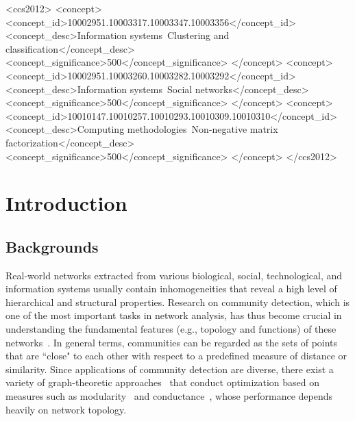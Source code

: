 \documentclass[format=acmsmall, review=false, screen=true]{acmart}
\begin{document}
%
%
\begin{CCSXML}
<ccs2012>
<concept>
<concept_id>10002951.10003317.10003347.10003356</concept_id>
<concept_desc>Information systems~Clustering and classification</concept_desc>
<concept_significance>500</concept_significance>
</concept>
<concept>
<concept_id>10002951.10003260.10003282.10003292</concept_id>
<concept_desc>Information systems~Social networks</concept_desc>
<concept_significance>500</concept_significance>
</concept>
<concept>
<concept_id>10010147.10010257.10010293.10010309.10010310</concept_id>
<concept_desc>Computing methodologies~Non-negative matrix factorization</concept_desc>
<concept_significance>500</concept_significance>
</concept>
</ccs2012>
\end{CCSXML}



\maketitle

\section{Introduction}\label{sec:1}
\subsection{Backgrounds}
Real-world networks extracted from various biological, social, technological, and information systems usually contain inhomogeneities that reveal a high level of hierarchical and structural properties. Research on community detection, which is one of the most important tasks in network analysis, has thus become crucial in understanding the fundamental features (e.g., topology and functions) of these networks~\cite{fortunato2010community}. In general terms, communities can be regarded as the sets of points that are ``close" to each other with respect to a predefined measure of distance or similarity. Since applications of community detection are diverse, there exist a variety of graph-theoretic approaches~\cite{leskovec2010empirical} that conduct optimization based on measures such as modularity~\cite{newman2006modularity} and conductance~\cite{leung2009towards}, whose performance depends heavily on network topology. 
\end{document}
